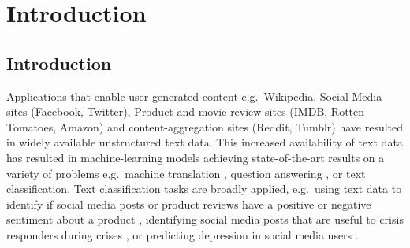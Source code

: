 \chapter{Introduction}\label{ch1}





\section{Introduction}



Applications that enable user-generated content e.g.\ Wikipedia, Social Media sites (Facebook, Twitter), Product and movie review sites (IMDB, Rotten Tomatoes, Amazon) and content-aggregation sites (Reddit, Tumblr) have resulted in widely available unstructured text data. This increased availability of text data has resulted in machine-learning models achieving state-of-the-art results on  a variety of problems e.g.\ machine translation \cite{Wu}, question answering \cite{Fisch2016}, or text classification. Text classification tasks are broadly applied, e.g.\  using text data to identify if social media posts or product reviews have a positive or negative sentiment about a product \cite{Burel2018},  identifying social media posts  that are useful to crisis responders during crises \cite{Burel2018}, or  predicting depression in social media users \cite{Aldarwish2017}. 


